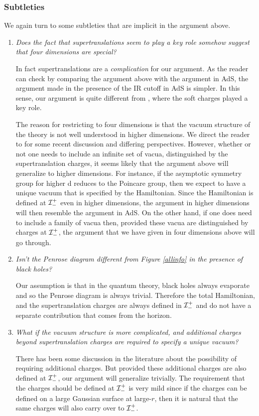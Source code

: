 \documentclass[12pt]{article}
\def \scrippast{{\cal I}^{+}_{-}}
\begin{document}
\subsubsection{Subtleties}
We again turn to some subtleties that are implicit in the argument above.
\begin{enumerate}[qseries]
\item {\em Does the fact that supertranslations seem to play a key role somehow suggest that four dimensions are special?}

In fact supertranslations are a {\em complication} for our argument. As the reader can check by comparing the argument above with the argument in AdS, the argument made in the presence of the IR cutoff in AdS is simpler. In this sense, our argument is quite different from \cite{Hawking:2016sgy,Hawking:2016msc}, where the soft charges played a key role.

The reason for restricting to four dimensions is that  the vacuum structure of the theory is not well understood in higher dimensions. We direct the reader to \cite{Kapec:2015vwa,Hollands:2016oma,Aggarwal:2018ilg,Campiglia:2017xkp,He:2019pll} for some recent discussion and differing perspectives. However, whether or not one needs to include an infinite set of vacua, distinguished by
the supertranslation charges, it seems likely that the argument above will generalize to higher dimensions. For instance, if the asymptotic symmetry group for higher d reduces to the Poincare group, then we expect to have a unique vacuum that is specified by the Hamiltonian.
Since the Hamiltonian is defined at $\scrippast$ even in higher dimensions, the argument in higher dimensions will then resemble the argument in AdS. On the other hand, if one does need to include a family of vacua then, provided these vacua are distinguished by charges at $\scrippast$, the argument that we have given in four dimensions  above will go through.



\item{\em Isn't the Penrose diagram different from Figure \ref{allinfo}  in the presence of black holes?}

  Our assumption is that in the quantum theory, black holes always evaporate and so the Penrose diagram is always trivial. Therefore the total Hamiltonian, and the supertranslation charges are always defined in $\scrippast$ and do not have a separate contribution that comes from the horizon.

\item {\em What if the vacuum structure is more complicated, and additional charges beyond  supertranslation charges are required to specify a unique vacuum?}

There has been some discussion in the literature \cite{Campiglia:2016jdj,Sahoo:2018lxl} about the possibility of requiring
additional charges. But provided these additional charges are also defined at $\scrippast$, our argument will generalize trivially. The requirement that the charges should be defined at $\scrippast$ is very mild since if the charges
can be defined on a large Gaussian surface at large-$r$, then it is natural that the same charges will also carry over to $\scrippast$.
\end{enumerate}
\end{document}
